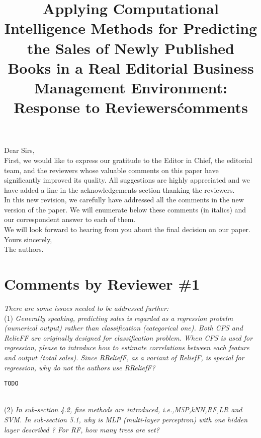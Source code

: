 \documentclass[preprint]{elsarticle}
\begin{document}

\title{Applying Computational Intelligence Methods for Predicting the Sales of Newly Published Books in a Real Editorial Business Management Environment: Response to Reviewers\' comments}

\noindent
Dear Sirs,\\

First, we would like to express our gratitude to the Editor in Chief, the editorial team, and the reviewers whose valuable comments on this paper have significantly improved its quality. All suggestions are highly appreciated and we have added a line in the acknowledgements section thanking the reviewers. \\

In this new revision, we carefully have addressed all the comments in the new version of the paper. We will enumerate below these comments (in italics) and our correspondent answer to each of them. \\

We will look forward to hearing from you about the final decision on our paper. \\

\noindent
Yours sincerely,\\
The authors.


\section{Comments by Reviewer \#1}

\noindent \emph{There are some issues needed to be addressed further:} \\

\noindent (1) \emph{Generally speaking, predicting sales is regarded as a regression probelm (numerical output) rather than classification (categorical one). Both CFS and RelieFF are originally designed for classification problem. When CFS is used for regression, please to introduce how to estimate correlations between each feature and output (total sales). Since RReliefF, as a variant of ReliefF, is special for regression, why do not the authors use RReliefF? } 

\begin{verbatim}
TODO
\end{verbatim}

~\\
\noindent (2) \emph{In sub-section 4.2, five methods are introduced, i.e.,M5P,kNN,RF,LR and SVM. In sub-section 5.1, why is MLP (multi-layer perceptron) with one hidden layer described ? For RF, how many trees are set? } 
\end{document}
